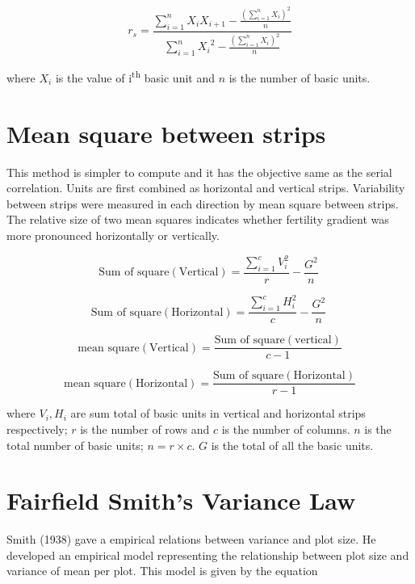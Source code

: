 \documentclass[
]{book}
\begin{document}
\[r_{s} = \frac{\sum_{i = 1}^{n}{X_{i}X_{i + 1} - \frac{\left( \sum_{i = 1}^{n}X_{i} \right)^{2}}{n}}}{\sum_{i = 1}^{n}{X_{i}}^{2} - \frac{\left( \sum_{i = 1}^{n}X_{i} \right)^{2}}{n}}\]

where \(X_{i}\) is the value of i\textsuperscript{th} basic unit and \(n\) is the number of
basic units.

\hypertarget{mean-square-between-strips}{%
\section{Mean square between strips}\label{mean-square-between-strips}}

This method is simpler to compute and it has the objective same as the
serial correlation. Units are first combined as horizontal and vertical
strips. Variability between strips were measured in each direction by
mean square between strips. The relative size of two mean squares
indicates whether fertility gradient was more pronounced horizontally or
vertically.

\[\text{Sum of square}\left( \text{Vertical}\right)=\frac{\sum_{i = 1}^{c}V_{i}^{2}}{r} - \frac{G^{2}}{n}\ \]

\[\text{Sum of square}\left( \text{Horizontal}\right)=\frac{\sum_{i = 1}^{c}H_{i}^{2}}{c} - \frac{G^{2}}{n}\ \]

\[\text{mean square}\left( \text{Vertical} \right) = \frac{\text{Sum of square}\left( \text{vertical} \right)}{c - 1}\]

\[\text{mean square}\left( \text{Horizontal} \right) = \frac{\text{Sum of square}\left( \text{Horizontal} \right)}{r - 1}\]

where \(V_{i},H_{i}\) are sum total of basic units in vertical and
horizontal strips respectively; \(r\) is the number of rows and \(c\) is the
number of columns. \(n\) is the total number of basic units;
\(n = r \times c\). \(G\) is the total of all the basic units.

\hypertarget{fairfield-smiths-variance-law}{%
\section{Fairfield Smith's Variance Law}\label{fairfield-smiths-variance-law}}

Smith (1938) gave a empirical relations between variance and plot size.
He developed an empirical model representing the relationship between
plot size and variance of mean per plot. This model is given by the
equation
\end{document}
